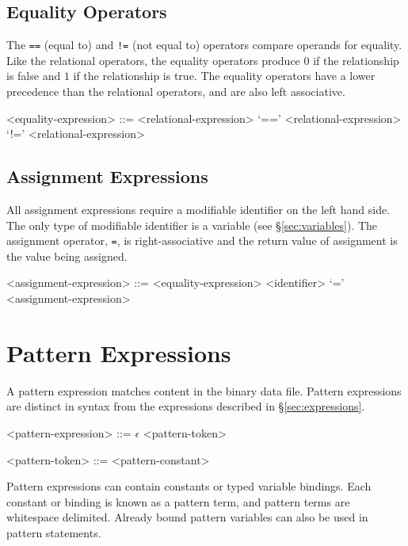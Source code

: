 \subsection{Equality Operators}
The \texttt{==} (equal to) and \texttt{!=} (not equal to) operators compare operands for equality.  Like the relational operators, the equality operators produce $0$ if the relationship is false and $1$ if the relationship is true.  The equality operators have a lower precedence than the relational operators, and are also left associative.
\begin{grammar}
<equality-expression> ::= <relational-expression>
 `==' <relational-expression>
 `!=' <relational-expression>
\end{grammar}


\subsection{Assignment Expressions}
\label{sec:assignment}
All assignment expressions require a modifiable identifier on the left hand side.  The only type of modifiable identifier is a variable (see \S\ref{sec:variables}).  The assignment operator, \texttt{=}, is right-associative and the return value of assignment is the value being assigned.
\begin{grammar}
<assignment-expression> ::= <equality-expression>
\alt <identifier> `=' <assignment-expression>
\end{grammar}


\section{Pattern Expressions}
\label{sec:pattern-expressions}
A pattern expression matches content in the binary data file.  Pattern expressions are distinct in syntax from the expressions described in \S\ref{sec:expressions}.

\begin{grammar}
<pattern-expression> ::= $\epsilon$
 <pattern-token>

<pattern-token> ::= <pattern-constant>
\end{grammar}

Pattern expressions can contain constants or typed variable bindings.  Each constant or binding is known as a pattern term, and pattern terms are whitespace delimited.  Already bound pattern variables can also be used in pattern statements.

